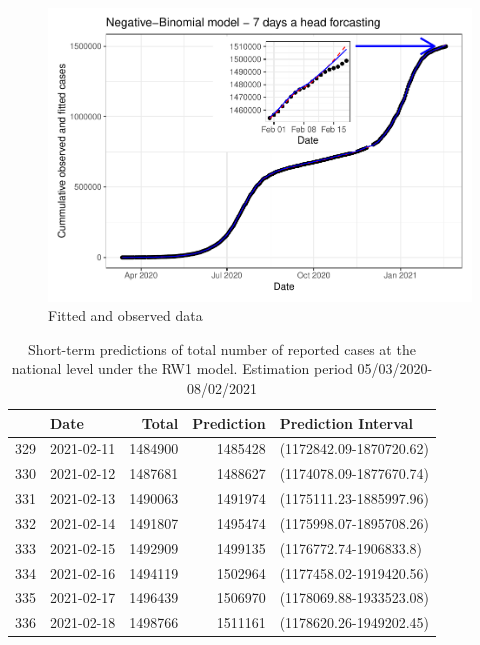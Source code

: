 \documentclass[10pt,letterpaper]{article}
\begin{document}
\begin{figure}
\includegraphics[width=0.99\linewidth]{COVIDincidenceSA_files/figure-latex/unnamed-chunk-8-1} \caption{Fitted and observed data}\label{fig:unnamed-chunk-8}
\end{figure}

\begin{table}

\caption{\label{tab:unnamed-chunk-9}Short-term predictions of total number of reported cases at the national level under the RW1 model. Estimation period 05/03/2020-08/02/2021}
\centering
\begin{tabular}[t]{l|l|r|r|l}
\hline
  & Date & Total & Prediction & Prediction Interval\\
\hline
329 & 2021-02-11 & 1484900 & 1485428 & (1172842.09-1870720.62)\\
\hline
330 & 2021-02-12 & 1487681 & 1488627 & (1174078.09-1877670.74)\\
\hline
331 & 2021-02-13 & 1490063 & 1491974 & (1175111.23-1885997.96)\\
\hline
332 & 2021-02-14 & 1491807 & 1495474 & (1175998.07-1895708.26)\\
\hline
333 & 2021-02-15 & 1492909 & 1499135 & (1176772.74-1906833.8)\\
\hline
334 & 2021-02-16 & 1494119 & 1502964 & (1177458.02-1919420.56)\\
\hline
335 & 2021-02-17 & 1496439 & 1506970 & (1178069.88-1933523.08)\\
\hline
336 & 2021-02-18 & 1498766 & 1511161 & (1178620.26-1949202.45)\\
\hline
\end{tabular}
\end{table}
\end{document}
